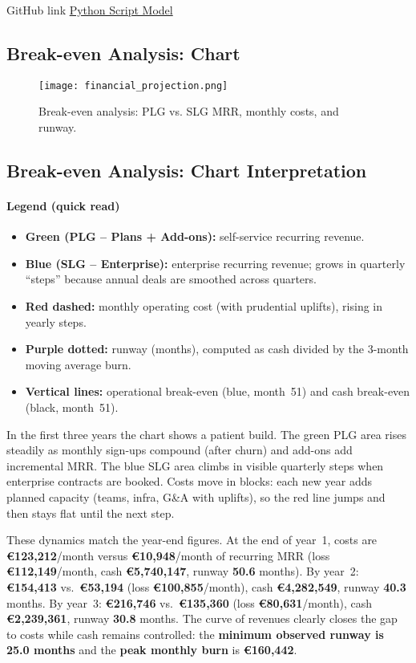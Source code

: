\documentclass[11pt, a4paper, oneside]{article}
\begin{document}
GitHub link \href{https://github.com/kuduk/intellyhub-businessplan/blob/main/breakeven.v2.02.py}{Python Script Model}

\newpage
\subsection{Break-even Analysis: Chart}
\begin{figure}[H]
    \centering 
    \texttt{[image: financial\_projection.png]}
    \caption{Break-even analysis: PLG vs. SLG MRR, monthly costs, and runway.}
    \label{fig:break_even_analysis}
\end{figure} 
\subsection{Break-even Analysis: Chart Interpretation}

\paragraph{Legend (quick read)}
\begin{itemize}
  \item \textbf{Green (PLG -- Plans + Add-ons):} self-service recurring revenue.
  \item \textbf{Blue (SLG -- Enterprise):} enterprise recurring revenue; grows in quarterly ``steps'' because annual deals are smoothed across quarters.
  \item \textbf{Red dashed:} monthly operating cost (with prudential uplifts), rising in yearly steps.
  \item \textbf{Purple dotted:} runway (months), computed as cash divided by the 3-month moving average burn.
  \item \textbf{Vertical lines:} operational break-even (blue, month~51) and cash break-even (black, month~51).
\end{itemize}

In the first three years the chart shows a patient build. The green PLG area rises steadily as monthly sign-ups compound (after churn) and add-ons add incremental MRR. The blue SLG area climbs in visible quarterly steps when enterprise contracts are booked. Costs move in blocks: each new year adds planned capacity (teams, infra, G\&A with uplifts), so the red line jumps and then stays flat until the next step.

These dynamics match the year-end figures. At the end of year~1, costs are \textbf{€123{,}212}/month versus \textbf{€10{,}948}/month of recurring MRR (loss \textbf{€112{,}149}/month, cash \textbf{€5{,}740{,}147}, runway \textbf{50.6} months). By year~2: \textbf{€154{,}413} vs.\ \textbf{€53{,}194} (loss \textbf{€100{,}855}/month), cash \textbf{€4{,}282{,}549}, runway \textbf{40.3} months. By year~3: \textbf{€216{,}746} vs.\ \textbf{€135{,}360} (loss \textbf{€80{,}631}/month), cash \textbf{€2{,}239{,}361}, runway \textbf{30.8} months. The curve of revenues clearly closes the gap to costs while cash remains controlled: the \textbf{minimum observed runway is 25.0 months} and the \textbf{peak monthly burn} is \textbf{€160{,}442}.
\end{document}
